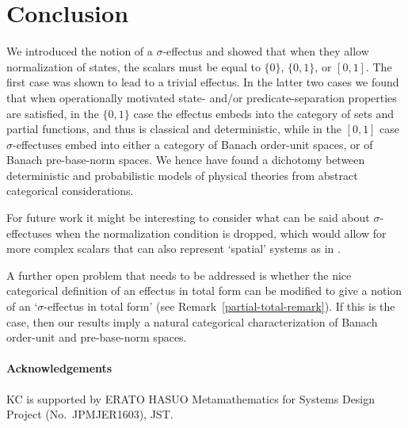 \documentclass[%
	submission,
copyright,creativecommons,UKenglish]{eptcs}
\begin{document}
\section{Conclusion}

We introduced the notion of a $\sigma$-effectus and showed that when they allow normalization of states,
the scalars must be equal to $\{0\}$, $\{0,1\}$, or $[0,1]$. 
The first case was shown to lead to a trivial effectus. 
In the latter two cases we found that when 
operationally motivated state- and/or predicate-separation properties 
are satisfied, in the $\{0,1\}$ case the effectus embeds into 
the category of sets and partial functions, and thus is classical and 
deterministic, while in the $[0,1]$ case $\sigma$-effectuses embed 
into either a category of Banach order-unit spaces, 
or of Banach pre-base-norm spaces. 
We hence have found a dichotomy between deterministic and probabilistic models of physical theories from abstract categorical considerations.

For future work it might be interesting to consider what can be said about $\sigma$-effectuses when the normalization condition is dropped, which would allow for more complex scalars that can also represent `spatial' systems as in \cite{moliner2017space}.

A further open problem that needs to be addressed is whether the nice
categorical definition of an effectus in total form can be modified to
give a notion of an `$\sigma$-effectus in total form'
(see Remark~\ref{partial-total-remark}).
If this is the
case, then our results imply a natural categorical characterization of
Banach order-unit and pre-base-norm spaces.

\paragraph{Acknowledgements}

KC is supported by
ERATO HASUO Metamathematics for Systems Design Project
(No.~JPMJER1603), JST\@.



\end{document}
